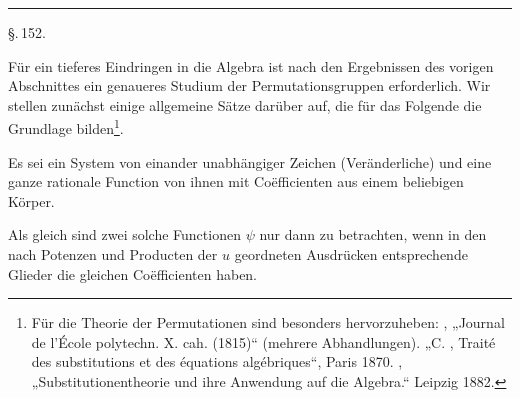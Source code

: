 \begin{center}
\end{center}

\begin{center}
\end{center}

\begin{center}
\rule{2cm}{0.4pt}
\end{center}

\begin{center}
\S.\,152.
\end{center}

\begin{center}
\end{center}

Für ein tieferes Eindringen in die Algebra ist nach den Ergebnissen des vorigen Abschnittes ein genaueres Studium der Permutationsgruppen erforderlich. Wir stellen zunächst einige allgemeine Sätze darüber auf, die für das Folgende die Grundlage bilden\footnote{Für die Theorie der Permutationen sind besonders hervorzuheben: , „Journal de l'École polytechn. X. cah. (1815)“ (mehrere Abhandlungen). „C. , Traité des substitutions et des équations algébriques“, Paris 1870. , „Substitutionentheorie und ihre Anwendung auf die Algebra.“ Leipzig 1882.}.

Es sei
ein System von einander unabhängiger Zeichen (Veränderliche) und
eine ganze rationale Function von ihnen mit Coëfficienten aus einem beliebigen Körper.

Als gleich sind zwei solche Functionen $\psi$ nur dann zu betrachten, wenn in den nach Potenzen und Producten der $u$ geordneten Ausdrücken entsprechende Glieder die gleichen Coëfficienten haben.

